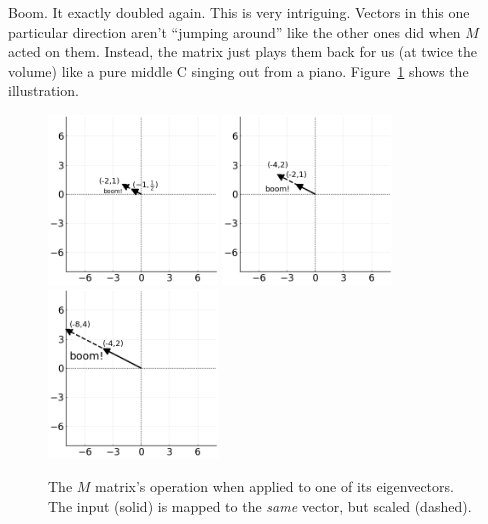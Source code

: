 
Boom. It exactly doubled again. This is very intriguing. Vectors in this one
particular direction aren't ``jumping around'' like the other ones did when $M$
acted on them. Instead, the matrix just plays them back for us (at twice the
volume) like a pure middle C singing out from a piano. Figure~\ref{eigenvec1}
shows the illustration.

\begin{figure}[ht]
\centering
\includegraphics[width=0.4\textwidth]{eigentrans1.png} \quad
\includegraphics[width=0.4\textwidth]{eigentrans2.png} \\
\smallskip
\includegraphics[width=0.4\textwidth]{eigentrans3.png}
\caption{The $M$ matrix's operation when applied to one of its eigenvectors.
The input (solid) is mapped to the \textit{same} vector, but scaled (dashed).}
\label{eigenvec1}
\end{figure}

